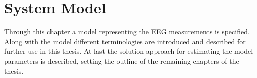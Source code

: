 \chapter{System Model}\label{ch:system_model}
Through this chapter a model representing the EEG measurements is specified. Along with the model different terminologies are introduced and described for further use in this thesis. At last the solution approach for estimating the model parameters is described, setting the outline of the remaining chapters of the thesis. 
    

